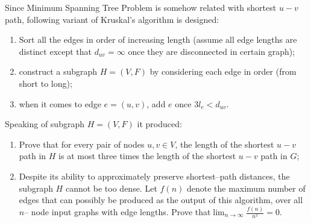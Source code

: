 \documentclass[11pt]{article}
\theoremstyle{numberplain}
\theoremstyle{nonumberplain}
\newcommand{\dps}{\displaystyle}
\newcommand{\0}{{\mathbf{0}}}
\begin{document}
\begin{ques} Since Minimum Spanning Tree Problem is somehow related with shortest $u-v$ path, following variant of Kruskal's algorithm is designed:
\begin{enumerate}
\item Sort all the edges in order of increasing length (assume all edge lengths are distinct except that $d_{uv}=\infty$ once they are disconnected in certain graph);
\item construct a subgraph $H=(V,F)$ by considering each edge in order (from short to long);
\item when it comes to edge $e=(u,v)$, add $e$ once $3 l_e<d_{uv}$.
\end{enumerate}
Speaking of subgraph $H=(V,F)$ it produced:
\begin{enumerate}
\item Prove that for every pair of nodes $u,v\in V$, the length of the shortest $u-v$ path in $H$ is at most three times the length of the shortest $u-v$ path in $G$;
\item Despite its ability to approximately preserve shortest--path distances, the subgraph $H$ cannot be too dense. Let $f(n)$ denote the maximum number of edges that can possibly be produced as the output of this algorithm, over all $n$-- node input graphs with edge lengths. Prove that$\dps \lim_{n\rightarrow \infty}\frac{f(n)}{n^2}=0$.
\end{enumerate}
\end{ques}
\end{document}
